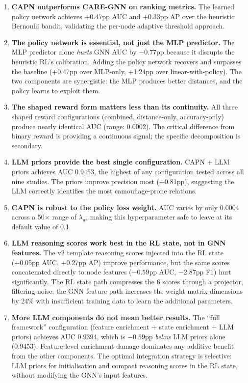 \begin{enumerate}
    \item \textbf{CAPN outperforms CARE-GNN on ranking metrics.} The learned policy network achieves +0.47pp AUC and +0.33pp AP over the heuristic Bernoulli bandit, validating the per-node adaptive threshold approach.

    \item \textbf{The policy network is essential, not just the MLP predictor.} The MLP predictor alone \emph{hurts} GNN AUC by $-0.77$pp because it disrupts the heuristic RL's calibration. Adding the policy network recovers and surpasses the baseline (+0.47pp over MLP-only, +1.24pp over linear-with-policy). The two components are synergistic: the MLP produces better distances, and the policy learns to exploit them.

    \item \textbf{The shaped reward form matters less than its continuity.} All three shaped reward configurations (combined, distance-only, accuracy-only) produce nearly identical AUC (range: 0.0002). The critical difference from binary reward is providing a continuous signal; the specific decomposition is secondary.

    \item \textbf{LLM priors provide the best single configuration.} CAPN + LLM priors achieves AUC 0.9453, the highest of any configuration tested across all nine studies. The priors improve precision most (+0.81pp), suggesting the LLM correctly identifies the most camouflage-prone relations.

    \item \textbf{CAPN is robust to the policy loss weight.} AUC varies by only 0.0004 across a 50$\times$ range of $\lambda_\pi$, making this hyperparameter safe to leave at its default value of 0.1.

    \item \textbf{LLM reasoning scores work best in the RL state, not in GNN features.} The v2 template reasoning scores injected into the RL state (+0.05pp AUC, +0.27pp AP) improve performance, but the same scores concatenated directly to node features ($-0.59$pp AUC, $-2.87$pp F1) hurt significantly. The RL state path compresses the 6 scores through a projector, filtering noise; the GNN feature path increases the weight matrix dimensions by 24\% with insufficient training data to learn the additional parameters.

    \item \textbf{More LLM components do not mean better results.} The ``full framework'' configuration (feature enrichment + state enrichment + LLM priors) achieves AUC 0.9394, which is $-0.59$pp \emph{below} LLM priors alone (0.9453). Feature-level enrichment damage dominates any additive benefit from the other components. The optimal integration strategy is selective: LLM priors for initialisation and compact reasoning scores in the RL state, without modifying the GNN's input features.


\end{enumerate}

